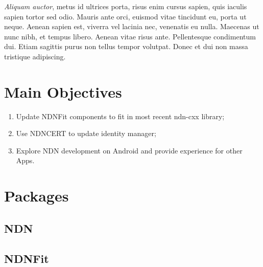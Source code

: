 \documentclass[a0,portrait]{poster}
\begin{document}
\begin{multicols}{2}
\textit{Aliquam auctor}, metus id ultrices porta, risus enim cursus sapien, quis iaculis sapien tortor sed odio. Mauris ante orci, euismod vitae tincidunt eu, porta ut neque. Aenean sapien est, viverra vel lacinia nec, venenatis eu nulla. Maecenas ut nunc nibh, et tempus libero. Aenean vitae risus ante. Pellentesque condimentum dui. Etiam sagittis purus non tellus tempor volutpat. Donec et dui non massa tristique adipiscing.


\color{DarkSlateGray} %

\section*{Main Objectives}

\begin{enumerate}
\item Update NDNFit components to fit in most recent ndn-cxx library;
\item Use NDNCERT to update identity manager;
\item Explore NDN development on Android and provide experience for other Apps.
\end{enumerate}


\section*{Packages}


\subsection*{NDN\cite{zhang2014named}}


\subsection*{NDNFit\cite{zhang2018ndnfit}}


\end{multicols}
\end{document}
